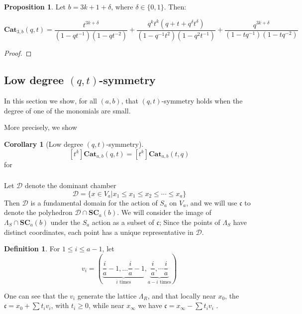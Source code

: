 \documentclass{amsart}[12pt]
\theoremstyle{definition}
\newtheorem{corollary}[dummy]{Corollary}
\newtheorem{definition}[dummy]{Definition}
\newtheorem{proposition}[dummy]{Proposition}
\newcommand{\SC}{\mathbf{SC}}
\newcommand{\Cat}{\mathbf{Cat}}
\newcommand{\cone}{\mathfrak{c}}
\newcommand{\dominant}{\mathcal{D}}
\begin{document}
 

\begin{proposition}
Let $b=3k+1+\delta$, where $\delta\in\{0,1\}$.  Then:

$$\Cat_{3,b}(q,t)=\frac{t^{3k+\delta}}{(1-qt^{-1})(1-qt^{-2})}+\frac{q^kt^k(q+t+q^\delta t^\delta)}{(1-q^{-1}t^2)(1-q^2t^{-1})}+\frac{q^{3k+\delta}}{(1-tq^{-1})(1-tq^{-2})}$$

\end{proposition}

\begin{proof}

\end{proof}


\subsection{Low degree \texorpdfstring{$(q,t)$}{(q,t)}-symmetry}
In this section we show, for all $(a,b)$, that $(q,t)$-symmetry holds when the degree of one of the monomials are small.  


More precisely, we show
\begin{corollary}[Low degree $(q,t)$-symmetry]
$$[t^k]\Cat_{a,b}(q,t)=[t^k]\Cat_{a,b}(t,q)$$
for 

\end{corollary}

\subsubsection{} 
Let $\dominant$ denote the dominant chamber $$\dominant=\{x\in V_a|x_1\leq x_1\leq x_2\leq\cdots\leq x_a\}$$
Then $\dominant$ is a fundamental domain for the action of $S_a$ on $V_a$, and we will use $\cone$ to denote the polyhedron $\dominant\cap\SC_{a}(b)$.  We will consider the image of $\Lambda_S\cap \SC_{a}(b)$ under the $S_a$ action as a subset of $\cone$;  Since the points of $\Lambda_S$ have distinct coordinates, each point has a unique representative in $\dominant$.  




\begin{definition}

For $1\leq i\leq a-1$, let $$v_i=\left(\underbrace{\frac{i}{a}-1,\dots \frac{i}{a}-1}_{i \text{ times}},\underbrace{ \frac{i}{a},\dotsm\frac{i}{a}}_{a-i \text{ times}}\right)$$
\end{definition}



One can see that the $v_i$ generate the lattice $\Lambda_R$, and that locally near $x_0$, the $\cone=x_0+\sum t_i v_i$, with $t_i\geq 0$, while near $x_\infty$ we have $\cone=x_\infty-\sum t_iv_i$ .
\end{document}
